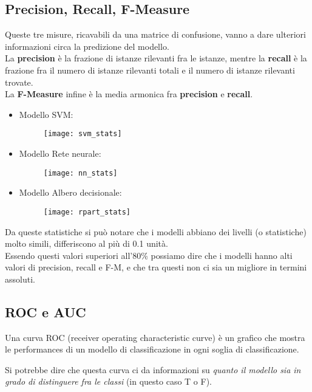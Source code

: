 \subsection{Precision, Recall, F-Measure}
Queste tre misure, ricavabili da una matrice di confusione, vanno a dare ulteriori informazioni circa la predizione del modello.\\
La \textbf{precision} è la frazione di istanze rilevanti fra le istanze, mentre la \textbf{recall} è la frazione fra il numero di istanze rilevanti totali e il numero di istanze rilevanti trovate.\\
La \textbf{F-Measure} infine è la media armonica fra \textbf{precision} e \textbf{recall}.

\begin{itemize}
	\item Modello SVM:
	\begin{figure}[H]
		\centering
		\texttt{[image: svm\_stats]}	
	\end{figure}
	\item Modello Rete neurale:
	\begin{figure}[H]
		\centering
		\texttt{[image: nn\_stats]}	
	\end{figure}
	\item Modello Albero decisionale:
	\begin{figure}[H]
		\centering
		\texttt{[image: rpart\_stats]}	
	\end{figure}
	
\end{itemize}

Da queste statistiche si può notare che i modelli abbiano dei livelli (o statistiche) molto simili, differiscono al più di 0.1 unità.\\
Essendo questi valori superiori all'80\% possiamo dire che i modelli hanno alti valori di precision, recall e F-M, e che tra questi non ci sia un migliore in termini assoluti.

\newpage

\subsection{ROC e AUC}

Una curva ROC (receiver operating characteristic curve) è un grafico che mostra le performances di un modello di classificazione in ogni soglia di classificazione.

Si potrebbe dire che questa curva ci da informazioni su \textit{quanto il modello sia in grado di distinguere fra le classi} (in questo caso T o F).\\

